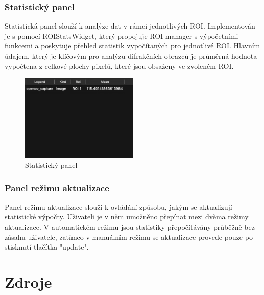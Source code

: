 \documentclass[a4paper,11pt]{article}
\begin{document}
\subsubsection{Statistický panel}
Statistická panel slouží k analýze dat v rámci jednotlivých ROI. Implementován je s pomocí ROIStatsWidget, který propojuje ROI manager s výpočetními funkcemi a poskytuje přehled statistik vypočítaných pro jednotlivé ROI. Hlavním údajem, který je klíčovým pro analýzu difrakčních obrazců je průměrná hodnota vypočtena z celkové plochy pixelů, které jsou obsaženy ve zvoleném ROI.
\begin{figure}[H]
    \centering
    \includegraphics[width=0.5\textwidth]{images/StatistickyPanel.png}
    \caption{Statistický panel}
\end{figure}

\subsubsection{Panel režimu aktualizace}
Panel režimu aktualizace slouží k ovládání způsobu, jakým se aktualizují statistické výpočty. Uživateli je v něm umožněno přepínat mezi dvěma režimy aktualizace. V automatickém režimu jsou statistiky přepočítávány průběžně bez zásahu uživatele, zatímco v manuálním režimu se aktualizace provede pouze po stisknutí tlačítka "update".\\

\newpage
\section{Zdroje}
\nocite{*}

\printbibliography
\end{document}
